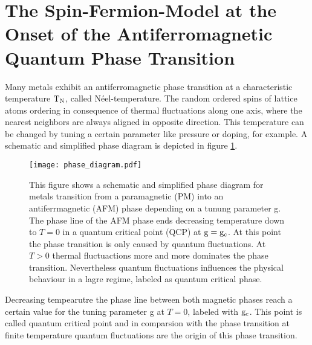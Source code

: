 \section{The Spin-Fermion-Model at the Onset of the Antiferromagnetic Quantum Phase Transition}
\label{sec:spin-fermion-model}
%
%
Many metals exhibit an antiferromagnetic phase transition at a characteristic temperature $\mathrm{T}_{\mathrm{N}}$, called N\'eel-temperature.
The random ordered spins of lattice atoms ordering in consequence of thermal fluctuations along one axis, where the nearest neighbors are always aligned in opposite direction.
This temperature can be changed by tuning a certain parameter like pressure or doping, for example.
A schematic and simplified phase diagram is depicted in figure \ref{fig:phase diagram}.
%
\begin{figure}[t]
	\centering
	\texttt{[image: phase\_diagram.pdf]}
	\caption{
This figure shows a schematic and simplified phase diagram for metals transition from a paramagnetic (PM) into an antiferrmagnetic (AFM) phase depending on a tunung parameter g.
The phase line of the AFM phase ends decreasing temperature down to $T = 0$ in a quantum critical point (QCP) at $\mathrm{g} = \mathrm{g}_{\mathrm{c}}$.
At this point the phase transition is only caused by quantum fluctuations.
At $T > 0$ thermal fluctuactions more and more dominates the phase transition.
Nevertheless quantum fluctuations influences the physical behaviour in a lagre regime, labeled as quantum critical phase.
	}
	\label{fig:phase diagram}
\end{figure}
%
Decreasing tempearutre the phase line between both magnetic phases reach a certain value for the tuning parameter g at $T = 0$, labeled with $\mathrm{g}_{\mathrm{c}}$.
This point is called quantum critical point and in comparsion with the phase transition at finite temperature quantum fluctuations are the origin of this phase transition.

